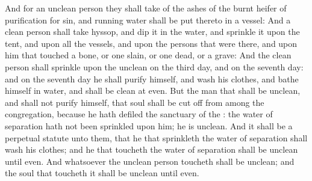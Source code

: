 \begin{biblechapter}
\verse And for an unclean person they shall take of the ashes of the burnt heifer of purification for sin, and running water shall be put thereto in a vessel:
\verse And a clean person shall take hyssop, and dip it in the water, and sprinkle it upon the tent, and upon all the vessels, and upon the persons that were there, and upon him that touched a bone, or one slain, or one dead, or a grave:
\verse And the clean person shall sprinkle upon the unclean on the third day, and on the seventh day: and on the seventh day he shall purify himself, and wash his clothes, and bathe himself in water, and shall be clean at even.
\verse But the man that shall be unclean, and shall not purify himself, that soul shall be cut off from among the congregation, because he hath defiled the sanctuary of the \LORD: the water of separation hath not been sprinkled upon him; he is unclean.
\verse And it shall be a perpetual statute unto them, that he that sprinkleth the water of separation shall wash his clothes; and he that toucheth the water of separation shall be unclean until even.
\verse And whatsoever the unclean person toucheth shall be unclean; and the soul that toucheth it shall be unclean until even.
\end{biblechapter}

